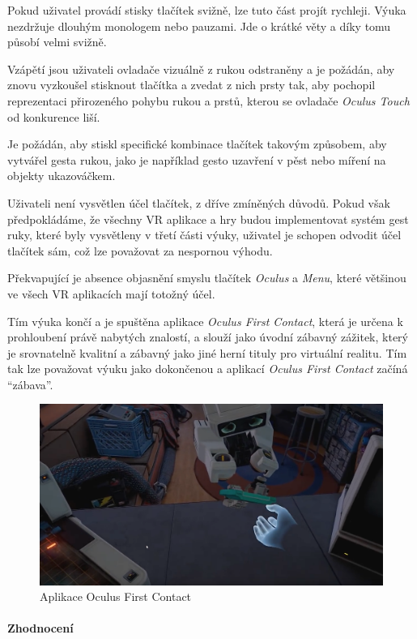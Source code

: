 Pokud uživatel provádí stisky tlačítek svižně, lze tuto část projít
rychleji. Výuka nezdržuje dlouhým monologem nebo pauzami. Jde o krátké
věty a díky tomu působí velmi svižně.

Vzápětí jsou uživateli ovladače vizuálně z rukou odstraněny a je
požádán, aby znovu vyzkoušel stisknout tlačítka a zvedat z nich prsty
tak, aby pochopil reprezentaci přirozeného pohybu rukou a prstů, kterou
se ovladače \emph{Oculus Touch} od konkurence liší. 

Je požádán, aby
stiskl specifické kombinace tlačítek takovým způsobem, aby vytvářel
gesta rukou, jako je například gesto uzavření v pěst nebo míření na
objekty ukazováčkem.

Uživateli není vysvětlen účel tlačítek, z dříve zmíněných důvodů. Pokud
však předpokládáme, že všechny VR aplikace a hry budou implementovat
systém gest ruky, které byly vysvětleny v třetí části výuky, uživatel je
schopen odvodit účel tlačítek sám, což lze považovat za nespornou
výhodu.

Překvapující je absence objasnění smyslu tlačítek \emph{Oculus} a
\emph{Menu}, které většinou ve všech VR aplikacích mají totožný účel.

Tím výuka končí a je spuštěna aplikace \emph{Oculus First Contact},
která je určena k prohloubení právě nabytých znalostí, a slouží jako
úvodní zábavný zážitek, který je srovnatelně kvalitní a zábavný jako
jiné herní tituly pro virtuální realitu. Tím tak lze považovat výuku
jako dokončenou a aplikací \emph{Oculus First Contact} začíná
``zábava''.

\begin{figure}
\centering
\includegraphics[width=12cm]{src/assets/oculus-first-contact.png}
\caption{Aplikace Oculus First Contact}
\end{figure}

\paragraph{Zhodnocení}\label{zhodnocenuxed-1}

